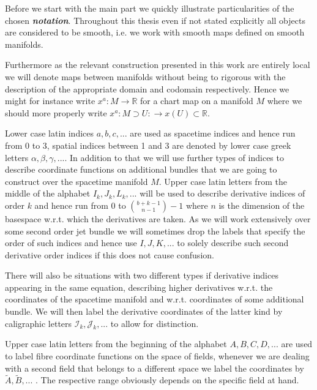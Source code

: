 \documentclass[a4paper,12pt, DIV=14, BCOR=5mm, twoside, headsepline]{scrbook}
\begin{document}


Before we start with the main part we quickly illustrate particularities of the chosen \textit{\textbf{notation}}. Throughout this thesis even if not stated explicitly all objects are considered to be smooth, i.e. we work with smooth maps defined on smooth manifolds. 

Furthermore as the relevant construction presented in this work are entirely local we will denote maps between manifolds without being to rigorous with the description of the appropriate domain and codomain respectively. Hence we might for instance write $x^a : M
\rightarrow \mathbb{R}$ for a chart map on a manifold $M$ where we should more properly write $x^a : M \supset U : \rightarrow x(U) \subset \mathbb{R} $. 

Lower case latin indices $a,b,c,...$ are used as spacetime indices and hence run from 0 to 3, spatial indices between 1 and 3 are denoted by lower case greek letters $\alpha,\beta,\gamma,...$. In addition to that we will use further types of indices to describe coordinate functions on additional bundles that we are going to construct over the spacetime manifold $M$. Upper case latin letters from the middle of the alphabet $I_k,J_k,L_k,...$ will be used to describe derivative indices of order $k$ and hence run from $0$ to $\binom{b+k-1}{n-1}-1$ where $n$ is the dimension of the basespace w.r.t. which the derivatives are taken. As we will work extensively over some second order jet bundle we will sometimes drop the labels that specify the order of such indices and hence use $I,J,K,...$ to solely describe such second derivative order indices if this does not cause confusion.

There will also be situations with two different types if derivative indices appearing in the same equation, describing higher derivatives w.r.t. the coordinates of the spacetime manifold and w.r.t. coordinates of some additional bundle. We will then label the derivative coordinates of the latter kind by caligraphic letters $\mathcal{I}_k, \mathcal{J}_k,...$ to allow for distinction.

Upper case latin letters from the beginning of the alphabet $A,B,C,D,...$ are used to label fibre coordinate functions on the space of fields, whenever we are dealing with a second field that belongs to a different space we label the coordinates by $\tilde{A}, \tilde{B},...$ . The respective range obviously depends on the specific field at hand.\\
\end{document}
